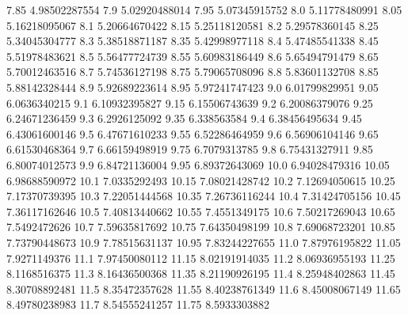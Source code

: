            7.85    4.98502287554
            7.9    5.02920488014
           7.95    5.07345915752
            8.0    5.11778480991
           8.05    5.16218095067
            8.1    5.20664670422
           8.15    5.25118120581
            8.2    5.29578360145
           8.25    5.34045304777
            8.3    5.38518871187
           8.35    5.42998977118
            8.4    5.47485541338
           8.45    5.51978483621
            8.5    5.56477724739
           8.55    5.60983186449
            8.6    5.65494791479
           8.65    5.70012463516
            8.7    5.74536127198
           8.75    5.79065708096
            8.8    5.83601132708
           8.85    5.88142328444
            8.9    5.92689223614
           8.95    5.97241747423
            9.0    6.01799829951
           9.05     6.0636340215
            9.1    6.10932395827
           9.15    6.15506743639
            9.2    6.20086379076
           9.25    6.24671236459
            9.3     6.2926125092
           9.35      6.338563584
            9.4    6.38456495634
           9.45    6.43061600146
            9.5    6.47671610233
           9.55    6.52286464959
            9.6    6.56906104146
           9.65    6.61530468364
            9.7    6.66159498919
           9.75     6.7079313785
            9.8    6.75431327911
           9.85    6.80074012573
            9.9    6.84721136004
           9.95    6.89372643069
           10.0    6.94028479316
          10.05    6.98688590972
           10.1     7.0335292493
          10.15    7.08021428742
           10.2    7.12694050615
          10.25    7.17370739395
           10.3    7.22051444568
          10.35    7.26736116244
           10.4    7.31424705156
          10.45    7.36117162646
           10.5    7.40813440662
          10.55     7.4551349175
           10.6    7.50217269043
          10.65     7.5492472626
           10.7    7.59635817692
          10.75    7.64350498199
           10.8    7.69068723201
          10.85    7.73790448673
           10.9    7.78515631137
          10.95    7.83244227655
           11.0    7.87976195822
          11.05     7.9271149376
           11.1    7.97450080112
          11.15    8.02191914035
           11.2    8.06936955193
          11.25     8.1168516375
           11.3    8.16436500368
          11.35    8.21190926195
           11.4    8.25948402863
          11.45    8.30708892481
           11.5    8.35472357628
          11.55    8.40238761349
           11.6    8.45008067149
          11.65    8.49780238983
           11.7    8.54555241257
          11.75     8.5933303882
